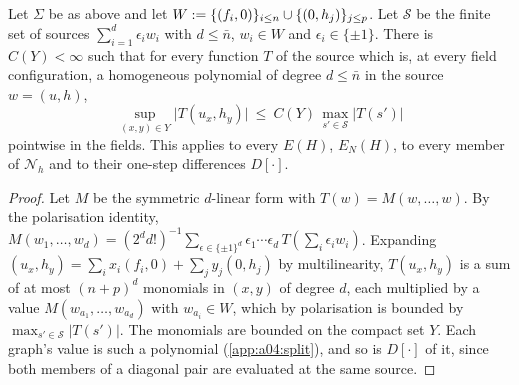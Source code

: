 \begin{lemma}\label{app:a04:lem:unif}
Let $\Sigma$ be as above and let $W:=\{(f_i,0)\}_{i\le n}\cup\{(0,h_j)\}_{j\le p}$. Let $\mathcal S$ be the finite set of sources $\sum_{i=1}^d\epsilon_iw_i$ with $d\le\bar n$, $w_i\in W$ and $\epsilon_i\in\{\pm1\}$. There is $C(Y)<\infty$ such that for every function $T$ of the source which is, at every field configuration, a homogeneous polynomial of degree $d\le\bar n$ in the source $w=(u,h)$,
\[
\sup_{(x,y)\in Y}\big|T(u_x,h_y)\big|\ \le\ C(Y)\,\max_{s'\in\mathcal S}\big|T(s')\big|
\]
pointwise in the fields. This applies to every $E(H)$, $E_N(H)$, to every member of $\mathcal N_h$ and to their one-step differences $D[\cdot]$.
\end{lemma}
\begin{proof}
Let $M$ be the symmetric $d$-linear form with $T(w)=M(w,\dots,w)$. By the polarisation identity, $M(w_1,\dots,w_d)=(2^dd!)^{-1}\sum_{\epsilon\in\{\pm1\}^d}\epsilon_1\cdots\epsilon_d\,T(\sum_i\epsilon_iw_i)$. Expanding $(u_x,h_y)=\sum_ix_i(f_i,0)+\sum_jy_j(0,h_j)$ by multilinearity, $T(u_x,h_y)$ is a sum of at most $(n+p)^d$ monomials in $(x,y)$ of degree $d$, each multiplied by a value $M(w_{a_1},\dots,w_{a_d})$ with $w_{a_i}\in W$, which by polarisation is bounded by $\max_{s'\in\mathcal S}|T(s')|$. The monomials are bounded on the compact set $Y$. Each graph's value is such a polynomial (\cref{app:a04:split}), and so is $D[\cdot]$ of it, since both members of a diagonal pair are evaluated at the same source.
\end{proof}

